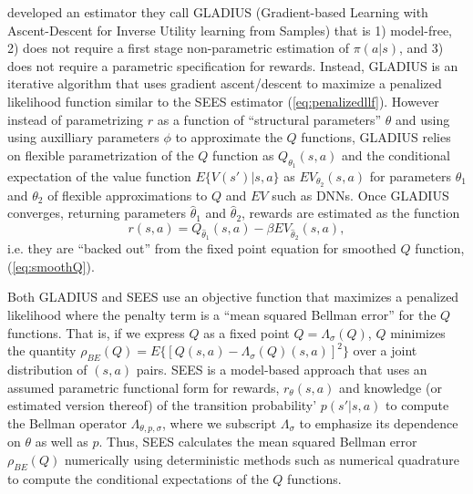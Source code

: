 \citet{kang:2025} developed an estimator they call GLADIUS (Gradient-based Learning with Ascent-Descent for Inverse Utility learning from Samples)
that is 1) model-free, 2) does not require a first stage non-parametric estimation of $\pi(a|s)$,
and 3) does not require a parametric specification for rewards. Instead, GLADIUS is an iterative 
algorithm that uses gradient ascent/descent to maximize a penalized likelihood function similar to the SEES estimator
(\ref{eq:penalizedllf}). However instead of parametrizing $r$ as a function of ``structural parameters''
$\theta$  and using using auxilliary parameters $\phi$ to approximate
the $Q$ functions, GLADIUS relies on 
flexible parametrization of the $Q$ function as $Q_{\theta_1}(s,a)$ and the conditional expectation of the value function $E\{V(s')|s,a\}$ as
$EV_{\theta_2}(s,a)$ for parameters $\theta_1$ and $\theta_2$ of flexible approximations
to $Q$ and $EV$ such as  DNNs. Once GLADIUS converges, returning parameters $\hat\theta_1$ and
$\hat\theta_2$, rewards are estimated as the function
\begin{equation}
             r(s,a) = Q_{\hat\theta_1}(s,a)-\beta EV_{\hat\theta_2}(s,a),
\end{equation}
i.e. they are  ``backed out'' from the fixed point equation for smoothed $Q$ function, (\ref{eq:smoothQ}).

Both GLADIUS and SEES use an objective function that maximizes a penalized likelihood where the penalty term 
is a ``mean squared Bellman error'' for the $Q$ functions. That is, if we express $Q$ as a fixed point $Q=\Lambda_\sigma(Q)$,
$Q$ minimizes the quantity $\rho_{BE}(Q)=E\{[Q(s,a)-\Lambda_\sigma(Q)(s,a)]^2\}$ over a joint distribution of $(s,a)$ pairs.
SEES is a model-based approach that uses an assumed parametric functional form
for rewards, $r_\theta(s,a)$ and  knowledge (or estimated version thereof) of the transition probability'
$p(s'|s,a)$ to compute the Bellman operator $\Lambda_{\theta,p,\sigma}$, where we subscript
$\Lambda_\sigma$ to emphasize its dependence on $\theta$ as well as $p$. Thus, SEES calculates
the mean squared Bellman error $\rho_{BE}(Q)$ numerically using deterministic methods such as numerical quadrature
to compute the conditional expectations of the $Q$ functions. 

